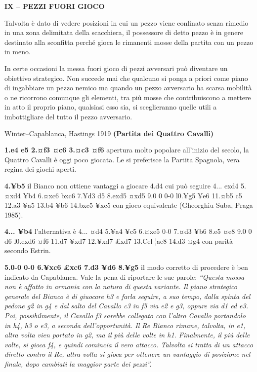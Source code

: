 \textbf{IX -- PEZZI FUORI GIOCO}

Talvolta è dato di vedere posizioni in cui un pezzo viene confinato
senza rimedio in una zona delimitata della scacchiera, il possessore di
detto pezzo è in genere destinato alla sconfitta perché gioca le
rimanenti mosse della partita con un pezzo in meno.

In certe occasioni la messa fuori gioco di pezzi avversari può diventare
un obiettivo strategico. Non succede mai che qualcuno si ponga a priori
come piano di ingabbiare un pezzo nemico ma quando un pezzo avversario
ha scarsa mobilità o ne ricorrono comunque gli elementi, tra più mosse
che contribuiscono a mettere in atto il proprio piano, qualsiasi esso
sia, si sceglieranno quelle utili a imbottigliare del tutto il pezzo
avversario.

Winter--Capablanca, Hastings 1919 \textbf{(Partita dei Quattro Cavalli)}

\textbf{1.e4 e5 2.¤f3 ¤c6 3.¤c3 ¤f6} apertura molto popolare all'inizio
del secolo, la Quattro Cavalli è oggi poco giocata. Le si preferisce la
Partita Spagnola, vera regina dei giochi aperti.

\textbf{4.¥b5} il Bianco non ottiene vantaggi a giocare 4.d4 cui può
seguire 4... exd4 5.¤xd4 ¥b4 6.¤xc6 bxc6 7.¥d3 d5 8.exd5 ¤xd5 9.0 0 0-0
l0.¥g5 ¥e6 11.¤b5 c5 12.a3 ¥a5 13.b4 ¥b6 14.bxc5 ¥xc5 con gioco
equivalente (Gheorghiu Suba, Praga 1985).

\textbf{4... ¥b4} l'alternativa è 4... ¤d4 5.¥a4 ¥c5 6.¤xe5 0-0 7.¤d3
¥b6 8.e5 ¤e8 9.0 0 d6 l0.exd6 ¤f6 11.d7 ¥xd7 12.¥xd7 £xd7 13.Cel ¦ae8
14.d3 ¤g4 con parità secondo Estrin.

\textbf{5.0-0 0-0 6.¥xc6 £xc6 7.d3 ¥d6 8.¥g5} il modo corretto di
procedere è ben indicato da Capablanca. Vale la pena di riportare le sue
parole: \emph{``Questa mossa non è affatto in armonia con la natura di
questa variante. Il piano strategico generale del Bianco è di giuocare
h3 e farla seguire, a suo tempo, dalla spinta del pedone g2 in g4 e dal
salto del Cavallo c3 in f5 via e2 e g3, oppure via d1 ed e3. Poi,
possibilmente, il Cavallo f3 sarebbe collegato con l'altro Cavallo
portandolo in h4, h3 o e3, a seconda dell'opportunità. Il Re Bianco
rimane, talvolta, in e1, altra volta vien portato in g2, ma il più delle
volte in h1. Finalmente, il più delle volte, si gioca f4, e quindi
comincia il vero attacco. Talvolta si tratta di un attacco diretto
contro il Re, altra volta si gioca per ottenere un vantaggio di
posizione nel finale, dopo cambiati la maggior parte dei pezzi''.}


